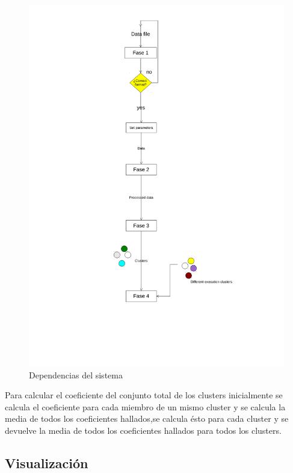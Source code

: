 \documentclass[10pt,a4paper]{article}
\begin{document}
\begin{figure}[H]
	\centering
	\includegraphics[scale=0.80]{./img/dependenciasKmeans.pdf}%
	\caption[Esquema de dependencias del sistema]{Dependencias del sistema}
	\label{fig:dependencias}
\end{figure}

Para calcular el coeficiente del conjunto total de los clusters inicialmente se calcula el coeficiente para cada miembro de un mismo cluster y se calcula la media de todos los coeficientes hallados,se calcula ésto para cada cluster y se devuelve la media de todos los coeficientes hallados para todos los clusters.\\

\subsection{Visualización}
\end{document}
